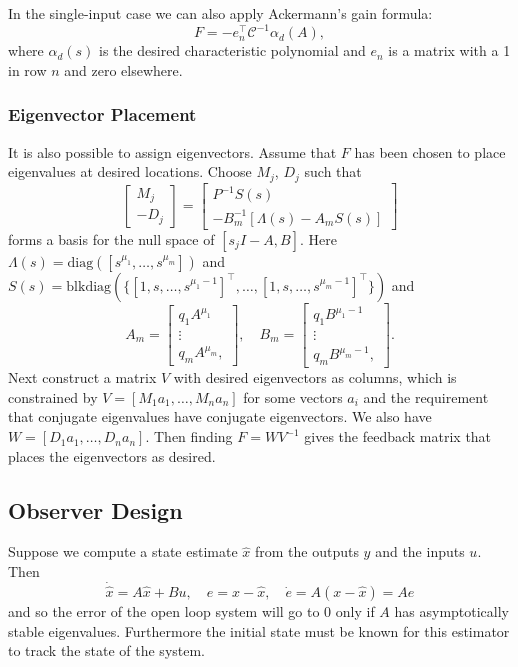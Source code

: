 \documentclass{article}
\begin{document}
In the single-input case we can also apply Ackermann's gain formula:
$$
F = -e_n^\top \mathcal{C}^{-1} \alpha_d(A),
$$
where $\alpha_d(s)$ is the desired characteristic polynomial and
$e_n$ is a matrix with a 1 in row $n$ and zero elsewhere.

\subsubsection{Eigenvector Placement}
It is also possible to assign eigenvectors. Assume that $F$ has been
chosen to place eigenvalues at desired locations.
Choose $M_j$, $D_j$ such that
$$
\left[\begin{array}{r}
  M_j \\ -D_j
\end{array}\right] =
\left[\begin{array}{r}
   P^{-1} S(s) \\
  -B_m^{-1}[\Lambda(s) - A_m S(s)]
\end{array}\right]
$$
forms a basis for the null space of $[s_j I - A, B]$. Here
$\Lambda(s) = \mathrm{diag}([s^{\mu_1}, \dots, s^{\mu_m}])$ and
$
S(s) =
\mathrm{blk diag}(\{
  [1, s, \dots, s^{\mu_1 - 1}]^\top,
  \dots,
  [1, s, \dots, s^{\mu_m - 1}]^\top
\})
$
and
$$
A_m =
\left[\begin{array}{c}
  q_1 A^{\mu_1} \\
  \vdots      \\
  q_m A^{\mu_m},
\end{array}\right], \quad
B_m =
\left[\begin{array}{c}
  q_1 B^{\mu_1 - 1} \\
  \vdots      \\
  q_m B^{\mu_m - 1},
\end{array}\right].
$$
Next construct a matrix $V$ with desired eigenvectors as columns,
which is constrained by $V = [M_1 a_1, \dots, M_n a_n]$ for some
vectors $a_i$ and the requirement that conjugate eigenvalues have
conjugate eigenvectors. We also have $W = [D_1 a_1, \dots, D_n a_n]$. Then
finding $F = WV^{-1}$ gives the feedback matrix that places the
eigenvectors as desired.

\subsection{Observer Design}
Suppose we compute a state estimate $\hat{x}$ from the outputs $y$ and
the inputs $u$. Then
$$
\dot{\hat{x}} = A\hat{x} + B u, \quad
e = x - \hat{x}, \quad
\dot{e} = A(x - \hat{x}) = Ae
$$
and so the error of the open loop system will go to 0 only if $A$ has
asymptotically stable eigenvalues. Furthermore the initial state must
be known for this estimator to track the state of the system.
\end{document}
